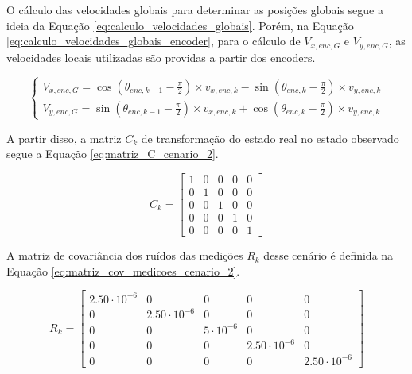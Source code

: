 \documentclass[acronym, symbols, table]{fei}
\begin{document}
			O cálculo das velocidades globais para determinar as posições globais segue a ideia da Equação \eqref{eq:calculo_velocidades_globais}. Porém, na Equação \eqref{eq:calculo_velocidades_globais_encoder}, para o cálculo de $V_{x,enc,G}$ e $V_{y,enc,G}$, as velocidades locais utilizadas são providas a partir dos encoders.
			
				\begin{equation}\label{eq:calculo_velocidades_globais_encoder}
					\begin{cases}
						V_{x,enc,G} = \cos(\theta_{enc,k-1} - \frac{\pi}{2}) \times v_{x,enc,k} - \sin(\theta_{enc,k} - \frac{\pi}{2}) \times v_{y,enc,k} \\
						V_{y,enc,G} = \sin(\theta_{enc,k-1} - \frac{\pi}{2}) \times v_{x,enc,k} + \cos(\theta_{enc,k} - \frac{\pi}{2}) \times v_{y,enc,k}
					\end{cases}
				\end{equation}
			
			A partir disso, a matriz $C_{k}$ de transformação do estado real no estado observado segue a Equação \eqref{eq:matriz_C_cenario_2}.
			
			\begin{equation}\label{eq:matriz_C_cenario_2}
				C_{k} = \begin{bmatrix}
					1 & 0 & 0 & 0 & 0 \\
					0 & 1 & 0 & 0 & 0 \\
					0 & 0 & 1 & 0 & 0 \\
					0 & 0 & 0 & 1 & 0 \\
					0 & 0 & 0 & 0 & 1
				\end{bmatrix}
			\end{equation}
			
			A matriz de covariância dos ruídos das medições $R_{k}$ desse cenário é definida na Equação \eqref{eq:matriz_cov_medicoes_cenario_2}.
			
			\begin{equation}\label{eq:matriz_cov_medicoes_cenario_2}
				R_{k} = \begin{bmatrix}
					2.50\cdot10^{-6} & 0 & 0 & 0 & 0 \\
					0 & 2.50\cdot10^{-6} & 0 & 0 & 0 \\
					0 & 0 & 5\cdot10^{-6} & 0 & 0 \\
					0 & 0 & 0 & 2.50\cdot10^{-6} & 0 \\
					0 & 0 & 0 & 0 & 2.50\cdot10^{-6}
				\end{bmatrix}
			\end{equation}
		
\end{document}
